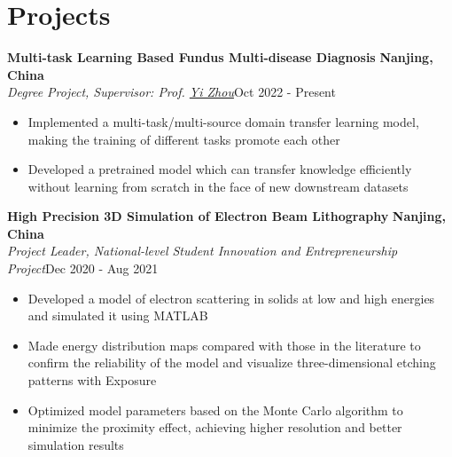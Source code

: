 \documentclass[letterpaper,11pt]{article}
\begin{document}
\section{\textbf{Projects}}
{\bf Multi-task Learning Based Fundus Multi-disease Diagnosis}  \hfill{\textbf{Nanjing, China} }\\
\textit{Degree Project, Supervisor: Prof. {\href{https://scholar.google.co.uk/citations?user=EnDCJKMAAAAJ&hl=en}{Yi Zhou}}}\hfill{Oct 2022 - Present}
\begin{itemize}
    \item Implemented a multi-task/multi-source domain transfer learning model, making the training of different tasks promote each other
    \item Developed a pretrained model which can transfer knowledge efficiently without learning from scratch in the face of new downstream datasets
\end{itemize}
\vspace{2pt}
{\bf High Precision 3D Simulation of Electron Beam Lithography}  \hfill{\textbf{Nanjing, China} }\\
\textit{Project Leader, National-level Student Innovation and Entrepreneurship Project}\hfill{Dec 2020 - Aug 2021}
\begin{itemize}
    \item Developed a model of electron scattering in solids at low and high energies and simulated it using MATLAB
    \item Made energy distribution maps compared with those in the literature to confirm the reliability of  the model and visualize three-dimensional etching patterns with Exposure
    \item Optimized model parameters based on the Monte Carlo algorithm to minimize the proximity effect, achieving higher resolution and better simulation results
\end{itemize}
\vspace{-9pt}

\end{document}
